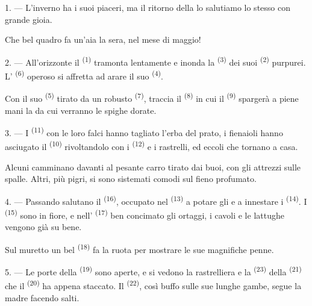 \VUsaut{3.0mm}
\VUsaut{3.0mm}

\VUsaut{4.0mm}

1. --- L'inverno ha i suoi piaceri, ma il ritorno della  lo salutiamo
lo stesso con grande gioia.

Che bel quadro fa un'aia la sera, nel mese di maggio!

2. --- All'orizzonte il  \textsuperscript{(1)} tramonta lentamente e
inonda la  \textsuperscript{(3)} dei suoi 
\textsuperscript{(2)} purpurei. L' \textsuperscript{(6)} operoso si
affretta ad arare il suo  \textsuperscript{(4)}.

Con il suo  \textsuperscript{(5)} tirato da un robusto 
\textsuperscript{(7)}, traccia il  \textsuperscript{(8)} in cui il
 \textsuperscript{(9)} spargerà a piene mani la  da
cui verranno le spighe dorate.

3. --- I  \textsuperscript{(11)} con le loro falci hanno tagliato
l'erba del prato, i fienaioli hanno asciugato il 
\textsuperscript{(10)} rivoltandolo con i  \textsuperscript{(12)} e i
rastrelli, ed eccoli che tornano a casa.

Alcuni camminano davanti al pesante carro tirato dai buoi, con gli attrezzi sulle
spalle. Altri, più pigri, si sono sistemati comodi sul fieno profumato.

4. --- Passando salutano il  \textsuperscript{(16)}, occupato
nel  \textsuperscript{(13)} a potare gli  e a
innestare i  \textsuperscript{(14)}. I 
\textsuperscript{(15)} sono in fiore, e nell' \textsuperscript{(17)} ben
concimato gli ortaggi, i cavoli e le lattughe vengono già su bene.

Sul muretto un bel  \textsuperscript{(18)} fa la ruota per mostrare le
sue magnifiche penne.

\VUsaut{3.0mm}

5. --- Le porte della  \textsuperscript{(19)} sono aperte, e si vedono la
rastrelliera e la  \textsuperscript{(23)} della 
\textsuperscript{(21)} che il  \textsuperscript{(20)} ha
appena staccato. Il  \textsuperscript{(22)}, così buffo sulle sue lunghe
gambe, segue la madre facendo salti.

